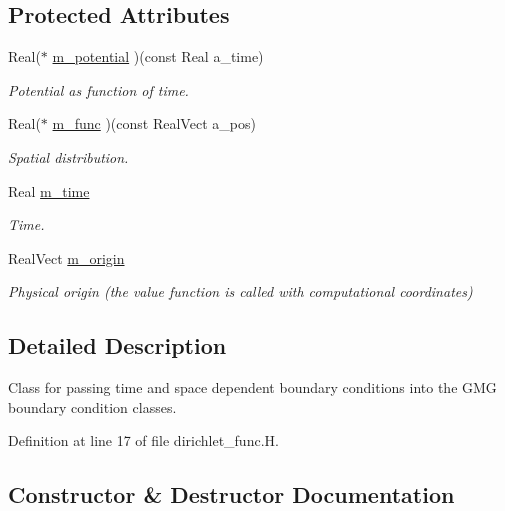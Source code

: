 \subsection*{Protected Attributes}
\begin{DoxyCompactItemize}
\item 
Real($\ast$ \hyperlink{classdirichlet__func_a54f22d2f89cebff2809deea1b770dcc3}{m\+\_\+potential} )(const Real a\+\_\+time)
\begin{DoxyCompactList}\small\item\em Potential as function of time. \end{DoxyCompactList}\item 
Real($\ast$ \hyperlink{classdirichlet__func_a337973800d112cdce7b5e5ea1cce7357}{m\+\_\+func} )(const Real\+Vect a\+\_\+pos)
\begin{DoxyCompactList}\small\item\em Spatial distribution. \end{DoxyCompactList}\item 
Real \hyperlink{classdirichlet__func_a955c8356798afbbb218ac6a11f6b1444}{m\+\_\+time}
\begin{DoxyCompactList}\small\item\em Time. \end{DoxyCompactList}\item 
Real\+Vect \hyperlink{classdirichlet__func_aac22852ea9503a4204f34585c0aaf6b7}{m\+\_\+origin}
\begin{DoxyCompactList}\small\item\em Physical origin (the value function is called with computational coordinates) \end{DoxyCompactList}\end{DoxyCompactItemize}


\subsection{Detailed Description}
Class for passing time and space dependent boundary conditions into the G\+MG boundary condition classes. 

Definition at line 17 of file dirichlet\+\_\+func.\+H.



\subsection{Constructor \& Destructor Documentation}
